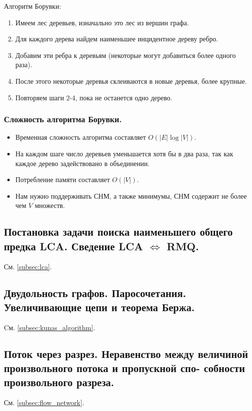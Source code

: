 \documentclass[a4paper,14pt]{article}
\begin{document}
    Алгоритм Борувки:
    \begin{enumerate}
        \item Имеем лес деревьев, изначально это лес из вершин графа.
        \item Для каждого дерева найдем наименьшее инцидентное дереву
        ребро.
        \item Добавим эти ребра к деревьям (некоторые могут добавиться
        более одного раза).
        \item После этого некоторые деревья склеиваются в новые деревья,
        более крупные.
        \item Повторяем шаги 2-4, пока не останется одно дерево.
    \end{enumerate}
    \subsubsection*{Сложность алгоритма Борувки.}
    \begin{itemize}
        \item Временная сложность алгоритма составляет $O(|E| \log |V|)$.
        \item На каждом шаге число деревьев уменьшается хотя бы в два
        раза, так как каждое дерево задействовано в объединении.
        \item Потребление памяти составляет $O(|V|)$.
        \item Нам нужно поддерживать СНМ, а также минимумы, СНМ
        содержит не более чем $V$ множеств.
    \end{itemize}
    \subsection{Постановка задачи поиска наименьшего общего предка LCA. Сведение LCA $\iff$ RMQ.}
    См. \ref{subsec:lca}.
    \subsection{Двудольность графов. Паросочетания. Увеличивающие цепи и теорема Бержа.}
    Cм. \ref{subsec:kunas_algorithm}.
    \subsection{Поток через разрез. Неравенство между величиной произвольного потока и пропускной спо-
    собности произвольного разреза.}
    См. \ref{subsec:flow_network}.
\end{document}
